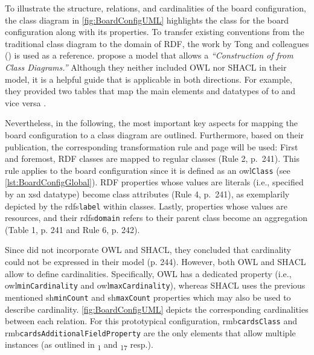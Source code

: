 \noindent To illustrate the structure, relations, and cardinalities of the board configuration, the class diagram in \autoref{fig:BoardConfigUML} highlights the class for the board configuration along with its properties. To transfer existing conventions from the traditional  class diagram to the domain of \acrshort*{RDF}, the work by Tong and colleagues (\citeyear{Tong2015}) is used as a reference. \citeauthor{Tong2015} propose a model that allows a \textit{“Construction of  from  Class Diagrams.”} Although they neither included \acrshort*{OWL} nor \acrshort*{SHACL} in their model, it is a helpful guide that is applicable in both directions. For example, they provided two tables that map the main elements and datatypes of  to  and vice versa \parencite[241,243]{Tong2015}.

Nevertheless, in the following, the most important key aspects for mapping the board configuration to a  class diagram are outlined. Furthermore, based on their publication, the corresponding transformation rule and page will be used: First and foremost, \acrshort*{RDF} classes are mapped to regular  classes (Rule 2, p.~241). This rule applies to the board configuration since it is defined as an \acrshort{owl}\texttt{Class} (see \autoref{lst:BoardConfigGlobal}). \acrshort*{RDF} properties whose values are literals (i.e., specified by an xsd datatype) become  class attributes (Rule 4, p.~241), as exemplarily depicted by the \acrshort{rdfs}\texttt{label} within classes. Lastly, properties whose values are resources, and their \acrshort{rdfs}\texttt{domain} refers to their parent class become an  aggregation (Table 1, p. 241 and Rule 6, p. 242).

Since \citeauthor{Tong2015} did not incorporate \acrshort*{OWL} and \acrshort*{SHACL}, they concluded that cardinality could not be expressed in their model (p. 244). However, both \acrshort*{OWL} and \acrshort*{SHACL} allow to define cardinalities. Specifically, \acrshort*{OWL} has a dedicated property (i.e., \acrshort{owl}\texttt{minCardinality} and \acrshort{owl}\texttt{maxCardinality}), whereas \acrshort*{SHACL} uses the previous mentioned \acrshort{sh}\texttt{minCount} and \acrshort{sh}\texttt{maxCount} properties which may also be used to describe cardinality. \autoref{fig:BoardConfigUML} depicts the corresponding cardinalities between each relation. For this prototypical configuration, \acrshort{rmb}\texttt{cardsClass} and \acrshort{rmb}\texttt{cardsAdditionalFieldProperty} are the only elements that allow multiple instances (as outlined in \textsubscript{1} and \textsubscript{17} resp.).





